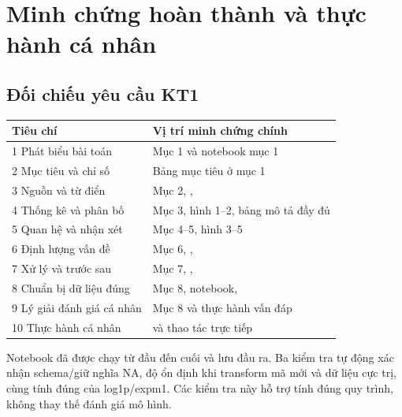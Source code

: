 \documentclass[12pt,a4paper]{article}
\begin{document}
\clearpage

\section{Minh chứng hoàn thành và thực hành cá nhân}

\subsection{Đối chiếu yêu cầu KT1}

\begingroup\small\setlength{\tabcolsep}{5pt}
\begin{tabularx}{\linewidth}{@{}YY@{}}\toprule

\textbf{Tiêu chí} & \textbf{Vị trí minh chứng chính}\\

\midrule

1 Phát biểu bài toán & Mục 1 và notebook mục 1\\

2 Mục tiêu và chỉ số & Bảng mục tiêu ở mục 1\\

3 Nguồn và từ điển & Mục 2, , \\

4 Thống kê và phân bố & Mục 3, hình 1–2, bảng mô tả đầy đủ\\

5 Quan hệ và nhận xét & Mục 4–5, hình 3–5\\

6 Định lượng vấn đề & Mục 6, , \\

7 Xử lý và trước sau & Mục 7, , \\

8 Chuẩn bị dữ liệu đúng & Mục 8, notebook, \\

9 Lý giải đánh giá cá nhân & Mục 8 và thực hành vấn đáp\\

10 Thực hành cá nhân &  và thao tác trực tiếp\\

\bottomrule\end{tabularx}\endgroup\par

Notebook đã được chạy từ đầu đến cuối và lưu đầu ra. Ba kiểm tra tự động xác nhận schema/giữ nghĩa NA, độ ổn định khi transform mã mới và dữ liệu cực trị, cùng tính đúng của log1p/expm1. Các kiểm tra này hỗ trợ tính đúng quy trình, không thay thế đánh giá mô hình.
\end{document}
